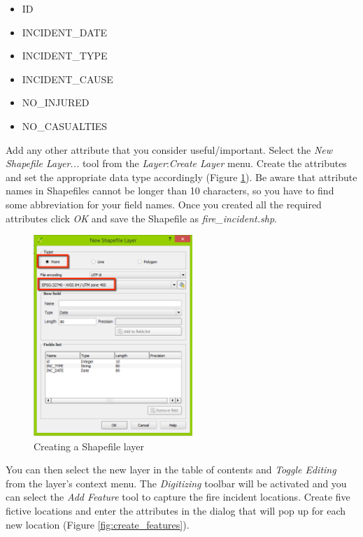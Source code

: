 \documentclass[a4paper,12pt,titlepage]{article}
\begin{document}
\begin{itemize}
\item ID
\item INCIDENT\_DATE
\item INCIDENT\_TYPE
\item INCIDENT\_CAUSE
\item NO\_INJURED
\item NO\_CASUALTIES
\end{itemize}

Add any other attribute that you consider useful/important. Select the \textit{New Shapefile Layer...} tool from the \textit{Layer}:\textit{Create Layer} menu. Create the attributes and set the appropriate data type accordingly (Figure \ref{fig:create_shapefile_layer}). Be aware that attribute names in Shapefiles cannot be longer than 10 characters, so you have to find some abbreviation for your field names. Once you created all the required attributes click \textit{OK} and save the Shapefile as \textit{fire\_incident.shp}.

\begin{figure}[htb]
\centering
\includegraphics[width=6cm]{Images/create_shapefile_layer.png}
\caption{Creating a Shapefile layer}\label{fig:create_shapefile_layer}
\end{figure}

You can then select the new layer in the table of contents and \textit{Toggle Editing} from the layer's context menu. The \textit{Digitizing} toolbar will be activated and you can select the \textit{Add Feature} tool to capture the fire incident locations. Create five fictive locations and enter the attributes in the dialog that will pop up for each new location (Figure \ref{fig:create_features}).
\end{document}
